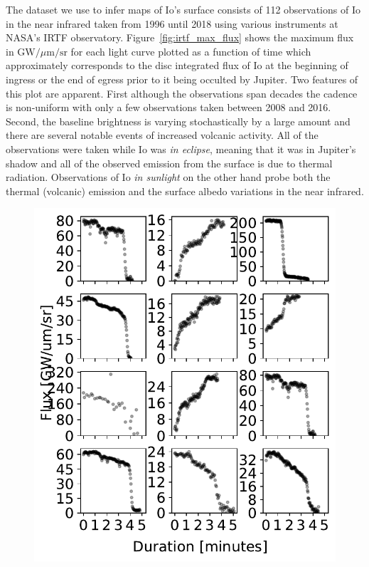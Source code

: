 \documentclass[modern]{aastex62}
\begin{document}
The dataset we use to infer maps of Io's surface consists of 112 observations of Io in the near infrared taken from 1996 until 2018 using various instruments at NASA's IRTF observatory.
Figure~\ref{fig:irtf_max_flux} shows the maximum flux in $\mathrm{GW}/\mu \mathrm{m}/\mathrm{sr}$ for each light curve plotted as a function of time which approximately corresponds to the disc integrated flux of Io at the beginning of ingress or the end of egress prior to it being occulted by Jupiter.
Two features of this plot are apparent.
First although the observations span decades the cadence is non-uniform with only a few observations taken between 2008 and 2016.
Second, the baseline brightness is varying stochastically by a large amount and there are several notable events of increased volcanic activity.
All of the observations were taken while Io was \emph{in eclipse}, meaning that it was in Jupiter's shadow and all of the observed emission from the surface is due to thermal radiation.
Observations of Io \emph{in sunlight} on the other hand probe both the thermal (volcanic) emission and the surface albedo variations in the near infrared.


\begin{figure}[h!]
    \begin{centering}
    \includegraphics[width=0.5\linewidth]{figures/irtf_sample_lightcurves.pdf}
    \end{centering}
\end{figure}
\end{document}
